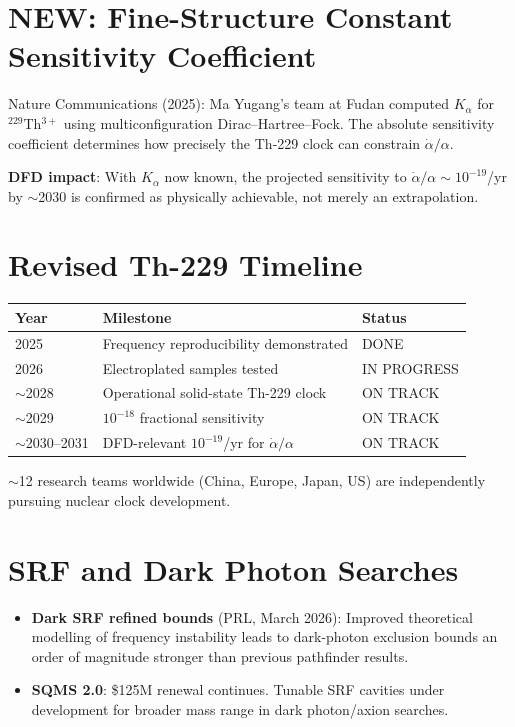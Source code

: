 \documentclass[11pt,a4paper]{article}
\newcommand{\NEW}{\textcolor{dfdblue}{\textbf{NEW}}}
\begin{document}
\section{\NEW: Fine-Structure Constant Sensitivity Coefficient}

Nature Communications (2025): Ma Yugang's team at Fudan computed $K_\alpha$ for $^{229}$Th$^{3+}$ using multiconfiguration Dirac--Hartree--Fock. The absolute sensitivity coefficient determines how precisely the Th-229 clock can constrain $\dot{\alpha}/\alpha$.

\textbf{DFD impact}: With $K_\alpha$ now known, the projected sensitivity to $\dot{\alpha}/\alpha \sim 10^{-19}$/yr by $\sim$2030 is confirmed as physically achievable, not merely an extrapolation.

\section{Revised Th-229 Timeline}

\begin{center}
\begin{tabular}{lll}
\toprule
\textbf{Year} & \textbf{Milestone} & \textbf{Status} \\
\midrule
2025 & Frequency reproducibility demonstrated & DONE \\
2026 & Electroplated samples tested & IN PROGRESS \\
$\sim$2028 & Operational solid-state Th-229 clock & ON TRACK \\
$\sim$2029 & $10^{-18}$ fractional sensitivity & ON TRACK \\
$\sim$2030--2031 & DFD-relevant $10^{-19}$/yr for $\dot{\alpha}/\alpha$ & ON TRACK \\
\bottomrule
\end{tabular}
\end{center}

$\sim$12 research teams worldwide (China, Europe, Japan, US) are independently pursuing nuclear clock development.

\section{SRF and Dark Photon Searches}

\begin{itemize}
\item \textbf{Dark SRF refined bounds} (PRL, March 2026): Improved theoretical modelling of frequency instability leads to dark-photon exclusion bounds an order of magnitude stronger than previous pathfinder results.
\item \textbf{SQMS 2.0}: \$125M renewal continues. Tunable SRF cavities under development for broader mass range in dark photon/axion searches.
\end{itemize}
\end{document}
